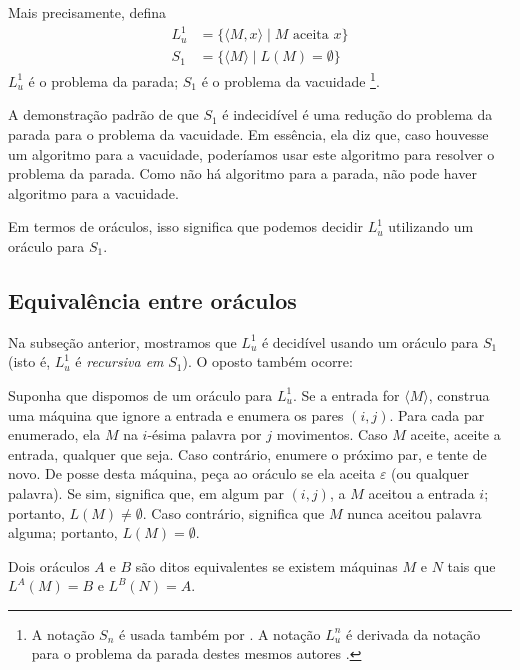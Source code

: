 Mais precisamente, defina
\begin{align*}
    L_u^1 &= \{ \langle M, x \rangle \mid M \text{ aceita } x \} \\
    S_1 &= \{ \langle M \rangle \mid L(M) = \emptyset \}
\end{align*}
$L_u^1$ é o problema da parada; $S_1$ é o problema da vacuidade%
\footnote{
    A notação $S_n$ é usada também por .
    A notação $L_u^n$ é derivada da notação para o problema da parada
    destes mesmos autores \cite[p.~183]{HopcroftUllman1979}.
}.

A demonstração padrão de que $S_1$ é indecidível
é uma redução do problema da parada para o problema da vacuidade.
Em essência, ela diz que,
caso houvesse um algoritmo para a vacuidade,
poderíamos usar este algoritmo para resolver o problema da parada.
Como não há algoritmo para a parada,
não pode haver algoritmo para a vacuidade.

Em termos de oráculos,
isso significa que podemos decidir $L_u^1$
utilizando um oráculo para $S_1$.

\subsection{Equivalência entre oráculos}

Na subseção anterior,
mostramos que $L_u^1$ é decidível usando um oráculo para $S_1$
(isto é, $L_u^1$ é \emph{recursiva em} $S_1$).
O oposto também ocorre:

Suponha que dispomos de um oráculo para $L_u^1$.
Se a entrada for $\langle M \rangle$,
construa uma máquina que ignore a entrada
e enumera os pares $(i, j)$.
Para cada par enumerado,
ela $M$ na $i$-ésima palavra por $j$ movimentos.
Caso $M$ aceite, aceite a entrada, qualquer que seja.
Caso contrário, enumere o próximo par, e tente de novo.
De posse desta máquina, peça ao oráculo se ela aceita $\varepsilon$
(ou qualquer palavra).
Se sim, significa que, em algum par $(i, j)$,
a $M$ aceitou a entrada $i$; portanto, $L(M) \neq \emptyset$.
Caso contrário, significa que $M$ nunca aceitou palavra alguma;
portanto, $L(M) = \emptyset$.

\begin{definition}
    Dois oráculos $A$ e $B$ são ditos equivalentes
    se existem máquinas $M$ e $N$ tais que
    $L^A(M) = B$ e $L^B(N) = A$.
\end{definition}

